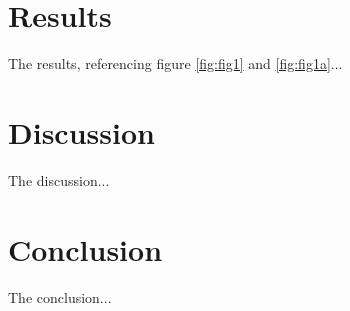 \documentclass{article}
\begin{document}

\section{Results}

The results, referencing figure \ref{fig:fig1} and \ref{fig:fig1a}...



\section{Discussion}

The discussion...



\section{Conclusion}

The conclusion...


\printbibliography
\end{document}
